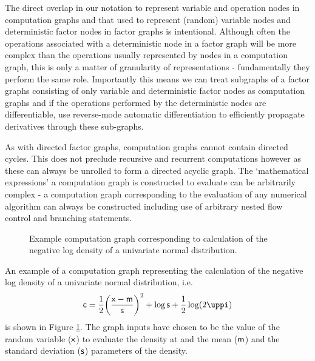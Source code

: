 The direct overlap in our notation to represent variable and operation nodes in computation graphs and that used to represent (random) variable nodes and deterministic factor nodes in factor graphs is intentional. Although often the operations associated with a deterministic node in a factor graph will be more complex than the operations usually represented by nodes in a computation graph, this is only a matter of granularity of representations - fundamentally they perform the same role. Importantly this means we can treat subgraphs of a factor graphs consisting of only variable and deterministic factor nodes as computation graphs and if the operations performed by the deterministic nodes are differentiable, use reverse-mode automatic differentiation to efficiently propagate derivatives through these sub-graphs.

As with directed factor graphs, computation graphs cannot contain directed cycles. This does not preclude recursive and recurrent computations however as these can always be unrolled to form a directed acyclic graph. The `mathematical expressions' a computation graph is constructed to evaluate can be arbitrarily complex - a computation graph corresponding to the evaluation of any numerical algorithm can always be constructed including use of arbitrary nested flow control and branching statements.

\begin{figure}[!t]
\vskip 0pt
\centering
{}
\vskip 0pt
\caption[Example computation graph.]{Example computation graph corresponding to calculation of the negative log density of a univariate normal distribution.
}
\label{fig:gaussian-density-computation-graph}
\end{figure}

An example of a computation graph representing the calculation of the negative log density of a univariate normal distribution, i.e.
\begin{equation}\label{eq:gaussian-nld-computation-graph-expression}
  \rvar{c} =
  \frac{1}{2}\lpa\frac{\rvar{x} - \rvar{m}}{\rvar{s}}\rpa^2 + \log\rvar{s} + \frac{1}{2}\log(2\uppi)
\end{equation}
is shown in Figure \ref{fig:gaussian-density-computation-graph}. The graph inputs have chosen to be the value of the random variable ($\mathsf{x}$) to evaluate the density at and the mean ($\mathsf{m}$) and the standard deviation ($\mathsf{s}$) parameters of the density. %


